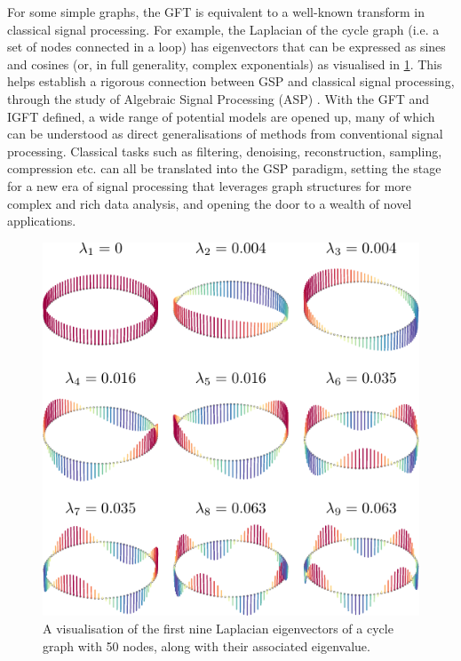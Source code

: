 For some simple graphs, the GFT is equivalent to a well-known transform in classical signal processing. For example, the Laplacian of the cycle graph (i.e. a set of nodes connected in a loop) has eigenvectors that can be expressed as sines and cosines (or, in full generality, complex exponentials) as visualised in \cref{fig:cycle_eighs}. This helps establish a rigorous connection between GSP and classical signal processing, through the study of Algebraic Signal Processing (ASP) \citep{Puschel2003,Sandryhaila2013}. With the GFT and IGFT defined, a wide range of potential models are opened up, many of which can be understood as direct generalisations of methods from conventional signal processing. Classical tasks such as filtering, denoising, reconstruction, sampling, compression etc. can all be translated into the GSP paradigm, setting the stage for a new era of signal processing that leverages graph structures for more complex and rich data analysis, and opening the door to a wealth of novel applications.

\begin{figure}[t]
	\centering
		\includegraphics[width=0.65\linewidth]{Figures/loop_plot.pdf}
        \caption[A visualisation of the Laplacian eigenvectors of the cycle graph]{A visualisation of the first nine Laplacian eigenvectors of a cycle graph with 50 nodes, along with their associated eigenvalue.}
	\label{fig:cycle_eighs}
\end{figure}






